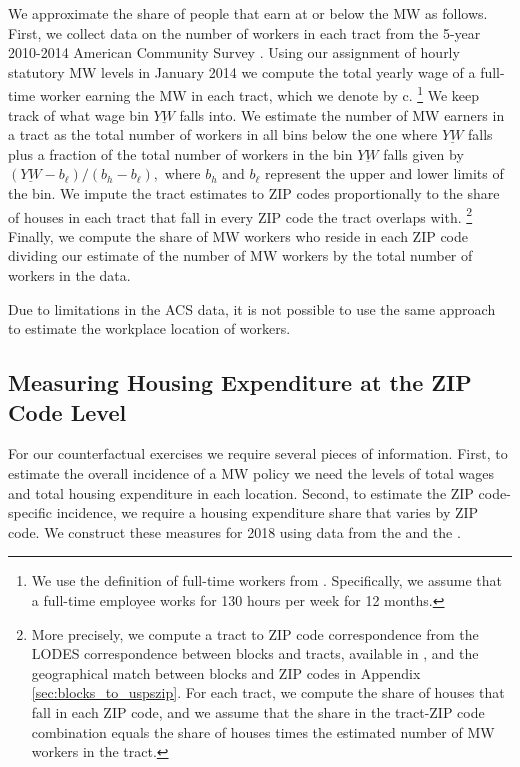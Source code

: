 We approximate the share of people that earn at or below the MW as follows.
First, we collect data on the number of workers in each tract from the 5-year 
2010-2014 American Community Survey \parencite{CensusACS}.
Using our assignment of hourly statutory MW levels in January 2014 we compute 
the total yearly wage of a full-time worker earning the MW in each tract, which 
we denote by c.%
\footnote{We use the definition of full-time workers from \textcite{IRSfulltime}.
Specifically, we assume that a full-time employee works for 130 hours per week
for 12 months.}
We keep track of what wage bin $\underline{YW}$ falls into.
We estimate the number of MW earners in a tract as the total number of workers 
in all bins below the one where $\underline{YW}$ falls plus a fraction of the 
total number of workers in the bin $\underline{YW}$ falls given by 
$\left(\underline{YW} - b_\ell\right)/\left(b_h - b_\ell\right),$
where $b_h$ and $b_\ell$ represent the upper and lower limits of 
the bin.
We impute the tract estimates to ZIP codes proportionally to the share of 
houses in each tract that fall in every ZIP code the tract overlaps with.%
\footnote{More precisely, we compute a tract to ZIP code correspondence from
the LODES correspondence between blocks and tracts, available in 
\parencite{CensusLODES}, and the geographical match between blocks and ZIP codes
in Appendix \ref{sec:blocks_to_uspszip}.
For each tract, we compute the share of houses that fall in each ZIP code, and 
we assume that the share in the tract-ZIP code combination equals the share of
houses times the estimated number of MW workers in the tract.}
Finally, we compute the share of MW workers who reside in each ZIP 
code dividing our estimate of the number of MW workers by the total
number of workers in the data.

Due to limitations in the ACS data, it is not possible to use the same approach 
to estimate the workplace location of workers.

\subsection{Measuring Housing Expenditure at the ZIP Code Level}
\label{sec:measure_housing_expenditure}

For our counterfactual exercises we require several pieces of information.
First, to estimate the overall incidence of a MW policy we need the levels 
of total wages and total housing expenditure in each location.
Second, to estimate the ZIP code-specific incidence, we require a housing 
expenditure share that varies by ZIP code.
We construct these measures for 2018 using data from the \textcite{IRS} and
the \textcite{hudSAFMR}.

